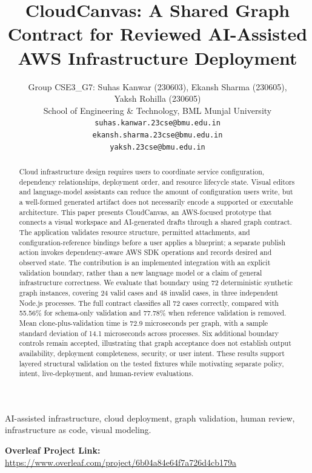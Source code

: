 \documentclass[12pt,a4paper,onecolumn,draftclsnofoot]{IEEEtran}
\newcommand{\OverleafProjectLink}{\url{https://www.overleaf.com/project/6b04a84e64f7a726d4cb179a}}
\begin{document}
\title{CloudCanvas: A Shared Graph Contract for Reviewed AI-Assisted AWS Infrastructure Deployment}
\author{Group CSE3\_G7: Suhas Kanwar (230603), Ekansh Sharma (230605),\\
Yaksh Rohilla (230605)\\
School of Engineering \& Technology, BML Munjal University\\
\texttt{suhas.kanwar.23cse@bmu.edu.in}\\
\texttt{ekansh.sharma.23cse@bmu.edu.in}\\
\texttt{yaksh.23cse@bmu.edu.in}}
\maketitle
\begin{abstract}
Cloud infrastructure design requires users to coordinate service configuration, dependency relationships, deployment order, and resource lifecycle state. Visual editors and language-model assistants can reduce the amount of configuration users write, but a well-formed generated artifact does not necessarily encode a supported or executable architecture. This paper presents CloudCanvas, an AWS-focused prototype that connects a visual workspace and AI-generated drafts through a shared graph contract. The application validates resource structure, permitted attachments, and configuration-reference bindings before a user applies a blueprint; a separate publish action invokes dependency-aware AWS SDK operations and records desired and observed state. The contribution is an implemented integration with an explicit validation boundary, rather than a new language model or a claim of general infrastructure correctness. We evaluate that boundary using 72 deterministic synthetic graph instances, covering 24 valid cases and 48 invalid cases, in three independent Node.js processes. The full contract classifies all 72 cases correctly, compared with 55.56\% for schema-only validation and 77.78\% when reference validation is removed. Mean clone-plus-validation time is 72.9 microseconds per graph, with a sample standard deviation of 14.1 microseconds across processes. Six additional boundary controls remain accepted, illustrating that graph acceptance does not establish output availability, deployment completeness, security, or user intent. These results support layered structural validation on the tested fixtures while motivating separate policy, intent, live-deployment, and human-review evaluations.
\end{abstract}
\begin{IEEEkeywords}
AI-assisted infrastructure, cloud deployment, graph validation, human review, infrastructure as code, visual modeling.
\end{IEEEkeywords}
\noindent\textbf{Overleaf Project Link:} \OverleafProjectLink
\end{document}
